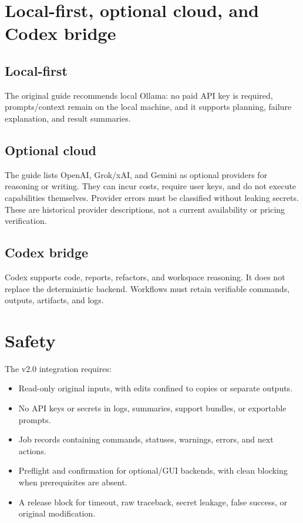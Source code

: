 \documentclass[11pt,a4paper]{article}
\begin{document}
\section{Local-first, optional cloud, and Codex bridge}
\subsection{Local-first}
The original guide recommends local Ollama: no paid API key is required,
prompts/context remain on the local machine, and it supports planning,
failure explanation, and result summaries.

\subsection{Optional cloud}
The guide lists OpenAI, Grok/xAI, and Gemini as optional providers for reasoning
or writing. They can incur costs, require user keys, and do not execute
capabilities themselves. Provider errors must be classified without leaking
secrets. These are historical provider descriptions, not a current availability
or pricing verification.

\subsection{Codex bridge}
Codex supports code, reports, refactors, and workspace reasoning. It does not
replace the deterministic backend. Workflows must retain verifiable commands,
outputs, artifacts, and logs.

\section{Safety}
The v2.0 integration requires:
\begin{itemize}[leftmargin=1.5em]
\item Read-only original inputs, with edits confined to copies or separate outputs.
\item No API keys or secrets in logs, summaries, support bundles, or exportable prompts.
\item Job records containing commands, statuses, warnings, errors, and next actions.
\item Preflight and confirmation for optional/GUI backends, with clean blocking when prerequisites are absent.
\item A release block for timeout, raw traceback, secret leakage, false success, or original modification.
\end{itemize}
\end{document}
